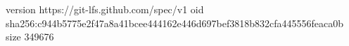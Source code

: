 version https://git-lfs.github.com/spec/v1
oid sha256:c944b5775e2f47a8a41bcee444162e446d697bef3818b832cfa445556feaca0b
size 349676
